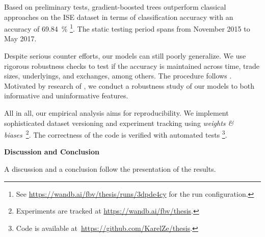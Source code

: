 Based on preliminary tests, gradient-boosted trees outperform classical approaches on the \gls{ISE} dataset in terms of classification accuracy with an accuracy of 69.84~\% \footnote{See \url{https://wandb.ai/fbv/thesis/runs/3dpde4cy} for the run configuration.}. The static testing period spans from November 2015 to May 2017.


Despite serious counter efforts, our models can still poorly generalize. We use rigorous robustness checks to test if the accuracy is maintained across time, trade sizes, underlyings, and exchanges, among others. The procedure follows \textcites{chakrabartyTradeClassificationAlgorithms2012}{grauerOptionTradeClassification2022}{ronenMachineLearningTrade2022}{savickasInferringDirectionOption2003}. Motivated by research of \textcite{grinsztajnWhyTreebasedModels2022}, we conduct a robustness study of our models to both informative and uninformative features.

All in all, our empirical analysis aims for reproducibility. We implement sophisticated dataset versioning and experiment tracking using \emph{weights \& biases}~\footnote{Experiments are tracked at \url{https://wandb.ai/fbv/thesis}.}. The correctness of the code is verified with automated tests \footnote{Code is available at~\url{https://github.com/KarelZe/thesis}.}. 

\textbf{Discussion and Conclusion}

A discussion and a conclusion follow the presentation of the results.


